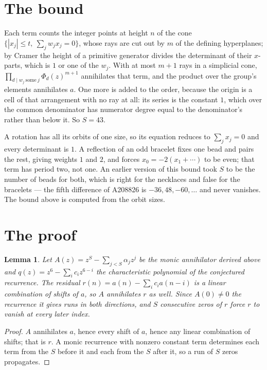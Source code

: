 \documentclass[11pt,a4paper]{article}
\theoremstyle{plain}
\newtheorem{lemma}[theorem]{Lemma}
\theoremstyle{definition}
\begin{document}
\section{The bound}

Each term counts the integer points at height $n$ of the cone
$\{|x_j|\le t,\ \sum_j w_jx_j=0\}$, whose rays are cut out by $m$ of the defining
hyperplanes; by Cramer the height of a primitive generator divides the determinant of their
$x$-parts, which is $1$ or one of the $w_j$. With at most $m+1$ rays in a simplicial cone,
$\prod_{d\mid w_j\ \text{some}\ j}\Phi_d(z)^{m+1}$ annihilates that term, and the product
over the group's elements annihilates $a$. One more is added to the order, because the origin
is a cell of that arrangement with no ray at all: its series is the constant $1$, which over
the common denominator has numerator degree equal to the denominator's rather than below it.
So $S=43$.

A rotation has all its orbits of one size, so its equation reduces to $\sum_jx_j=0$ and every
determinant is $1$. A reflection of an odd bracelet fixes one bead and pairs the rest, giving
weights $1$ and $2$, and forces $x_0=-2(x_1+\cdots)$ to be even; that term has period two, not
one. An earlier version of this bound took $S$ to be the number of beads for both, which is
right for the necklaces and false for the bracelets --- the fifth difference of A208826 is
$-36, 48, -60, \dots$ and never vanishes. The bound above is computed from the orbit sizes.

\section{The proof}

\begin{lemma}\label{lem:crit}
Let $A(z)=z^S-\sum_{j<S}\alpha_jz^{j}$ be the monic annihilator derived above and
$q(z)=z^{6}-\sum_ic_iz^{6-i}$ the characteristic polynomial of the conjectured
recurrence. The residual $r(n)=a(n)-\sum_ic_ia(n-i)$ is a linear combination of shifts of $a$,
so $A$ annihilates $r$ as well. Since $A(0)\ne0$ the recurrence it gives runs in both
directions, and $S$ consecutive zeros of $r$ force $r$ to vanish at every later index.
\end{lemma}

\begin{proof}
$A$ annihilates $a$, hence every shift of $a$, hence any linear combination of shifts; that is
$r$. A monic recurrence with nonzero constant term determines each term from the $S$ before it
and each from the $S$ after it, so a run of $S$ zeros propagates.
\end{proof}
\end{document}
